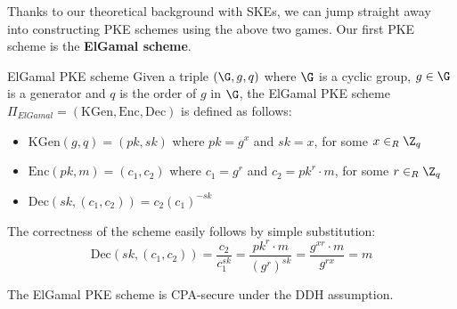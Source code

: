 \documentclass[a4paper, 12pt]{report}
\begin{document}
    Thanks to our theoretical background with SKEs, we can jump straight away into constructing PKE schemes using the above two games. Our first PKE scheme is the \textbf{ElGamal scheme}.

    \begin{framedalgo}{ElGamal PKE scheme}
        Given a triple $(\G,g,q)$ where $\G$ is a cyclic group, $g \in \G$ is a generator and $q$ is the order of $g$ in $\G$, the ElGamal PKE scheme $\Pi_{ElGamal} = (\mathrm{KGen}, \mathrm{Enc}, \mathrm{Dec})$ is defined as follows:
        \begin{itemize}
            \item $\mathrm{KGen}(g,q) = (pk, sk)$ where $pk = g^x$ and $sk = x$, for some  $x \in_R \Z_q$
            \item $\mathrm{Enc}(pk, m) = (c_1, c_2)$ where $c_1 = g^r$ and $c_2 = pk^r\cdot m$, for some $r \in_R \Z_q$
            \item $\mathrm{Dec}(sk, (c_1, c_2)) = c_2 (c_1)^{-sk}$ 
        \end{itemize}
    \end{framedalgo}

    The correctness of the scheme easily follows by simple substitution:
    \[\mathrm{Dec}(sk, (c_1, c_2)) = \frac{c_2}{c_1^{sk}} = \frac{pk^r \cdot m}{(g^{r})^{sk}} = \frac{g^{xr} \cdot m}{g^{rx}} = m\]

    \begin{framedthm}{}
        The ElGamal PKE scheme is CPA-secure under the DDH assumption.
    \end{framedthm}
\end{document}

